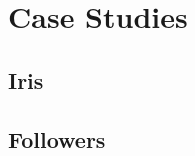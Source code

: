 \chapter{Case Studies}
\label{chapter5}

\graphicspath{{Chapter5/figs/}}

\section{Iris} %
\label{section5.1}



\section{Followers} %
\label{section5.2}
